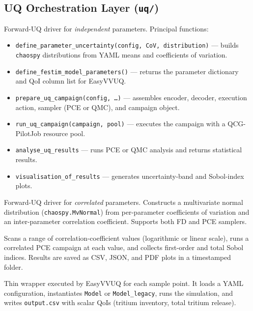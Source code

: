\documentclass[11pt,a4paper]{article}
\begin{document}
\subsection{UQ Orchestration Layer (\texttt{uq/})}

\begin{description}[style=nextline]
  \item[\texttt{easyvvuq\_festim.py}]
    Forward-UQ driver for \emph{independent} parameters.  Principal
    functions:
    \begin{itemize}[nosep]
      \item \texttt{define\_parameter\_uncertainty(config, CoV, distribution)}
            --- builds \texttt{chaospy} distributions from YAML means and
            coefficients of variation.
      \item \texttt{define\_festim\_model\_parameters()} --- returns the
            parameter dictionary and QoI column list for EasyVVUQ.
      \item \texttt{prepare\_uq\_campaign(config, \dots)} --- assembles
            encoder, decoder, execution action, sampler (PCE or QMC),
            and campaign object.
      \item \texttt{run\_uq\_campaign(campaign, pool)} --- executes the
            campaign with a QCG-PilotJob resource pool.
      \item \texttt{analyse\_uq\_results} --- runs PCE or QMC analysis and
            returns statistical results.
      \item \texttt{visualisation\_of\_results} --- generates uncertainty-band
            and Sobol-index plots.
    \end{itemize}

  \item[\texttt{easyvvuq\_festim\_correlated.py}]
    Forward-UQ driver for \emph{correlated} parameters.  Constructs a
    multivariate normal distribution (\texttt{chaospy.MvNormal}) from
    per-parameter coefficients of variation and an inter-parameter
    correlation coefficient.  Supports both FD and PCE samplers.

  \item[\texttt{covariance\_influence\_analysis.py}]
    Scans a range of correlation-coefficient values (logarithmic or linear
    scale), runs a correlated PCE campaign at each value, and collects
    first-order and total Sobol indices.  Results are saved as CSV, JSON,
    and PDF plots in a timestamped folder.

  \item[\texttt{festim\_model\_run.py}]
    Thin wrapper executed by EasyVVUQ for each sample point.  It loads a
    YAML configuration, instantiates \texttt{Model} or
    \texttt{Model\_legacy}, runs the simulation, and writes
    \texttt{output.csv} with scalar QoIs (tritium inventory, total tritium
    release).


\end{description}
\end{document}
